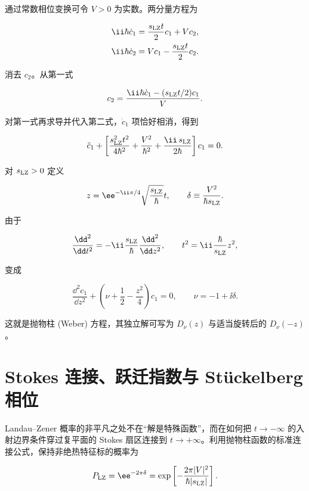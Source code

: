 通过常数相位变换可令 \(V>0\) 为实数。两分量方程为

\begin{align*}
\ii\hbar\dot c_1
&=\frac{s_{\rm LZ} t}{2}c_1+Vc_2,
\\
\ii\hbar\dot c_2
&=Vc_1-\frac{s_{\rm LZ} t}{2}c_2.
\end{align*}

消去 \(c_2\)。从第一式

\[
c_2
=\frac{\ii\hbar\dot c_1-(s_{\rm LZ} t/2)c_1}{V}.
\]

对第一式再求导并代入第二式，\(\dot c_1\) 项恰好相消，得到

\begin{equation}
\ddot c_1
+\left[
\frac{s_{\rm LZ}^2t^2}{4\hbar^2}
+\frac{V^2}{\hbar^2}
+\frac{\ii\,s_{\rm LZ}}{2\hbar}
\right]c_1=0.
\label{eq:lz-second-order}
\end{equation}

对 \(s_{\rm LZ}>0\) 定义

\[
z=\ee^{-\ii\pi/4}
\sqrt{\frac{s_{\rm LZ}}{\hbar}}t,
\qquad
\delta\equiv\frac{V^2}{\hbar s_{\rm LZ}}.
\]

由于

\[
\frac{\dd^2}{\dd t^2}
=-\ii\frac{s_{\rm LZ}}{\hbar}
\frac{\dd^2}{\dd z^2},
\qquad
 t^2=\ii\frac{\hbar}{s_{\rm LZ}}z^2,
\]

 变成

\begin{equation}
\frac{\dd^2c_1}{\dd z^2}
+\left(
\nu+\frac12-\frac{z^2}{4}
\right)c_1=0,
\qquad
\nu=-1+\ii\delta.
\label{eq:lz-weber}
\end{equation}

这就是抛物柱 (Weber) 方程，其独立解可写为 \(D_\nu(z)\) 与适当旋转后的 \(D_\nu(-z)\)。

\section{Stokes 连接、跃迁指数与 Stückelberg 相位}

Landau--Zener 概率的非平凡之处不在“解是特殊函数”，而在如何把 \(t\to-\infty\) 的入射边界条件穿过复平面的 Stokes 扇区连接到 \(t\to+\infty\)。利用抛物柱函数的标准连接公式，保持非绝热特征标的概率为

\begin{equation}
P_{\rm LZ}
=\ee^{-2\pi\delta}
=\exp\left[-\frac{2\pi|V|^2}{\hbar|s_{\rm LZ}|}\right].
\label{eq:landau-zener}
\end{equation}

